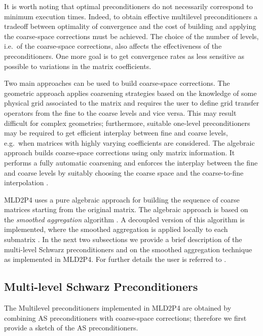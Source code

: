 It is worth noting that optimal preconditioners do not necessarily correspond
to minimum execution times. Indeed, to obtain effective multilevel preconditioners
a tradeoff between optimality of convergence and the cost of building and applying
the coarse-space corrections must be achieved. The choice of the number of levels,
i.e.\ of the coarse-space corrections, also affects the effectiveness of the
preconditioners. One more goal is to get convergence rates as less sensitive
as possible to variations in the matrix coefficients.

Two main approaches can be used to build coarse-space corrections. The geometric approach
applies coarsening strategies based on the knowledge of some physical grid associated
to the matrix and requires the user to define grid transfer operators from the fine
to the coarse levels and vice versa. This may result difficult for complex geometries;
furthermore, suitable one-level preconditioners may be required to get efficient
interplay between fine and coarse levels, e.g.\ when matrices with highly varying coefficients
are considered. The algebraic approach builds coarse-space corrections using only matrix
information. It performs a fully automatic coarsening and enforces the interplay between
the fine and coarse levels by suitably choosing the coarse space and the coarse-to-fine
interpolation \cite{StubenGMD69_99}.

MLD2P4 uses a pure algebraic approach for building the sequence of coarse matrices
starting from the original matrix. The algebraic approach is based on the \emph{smoothed 
aggregation} algorithm \cite{Brezina_Vanek_,Vanek_Mandel_Brezina_}. A decoupled version
of this algorithm is implemented, where the smoothed aggregation is applied locally
to each submatrix \cite{Tuminaro_Tong_00}. In the next two subsections we provide
a brief description of the multi-level Schwarz preconditioners and on the smoothed
aggregation technique as implemented in MLD2P4. For further details the user
is referred to \cite{para_04,apnum_07,aaecc_07,dd2_96}.


\subsection{Multi-level Schwarz Preconditioners\label{sec:multilevel}}

The Multilevel preconditioners implemented in MLD2P4 are obtained by combining
AS preconditioners with coarse-space corrections; therefore
we first provide a sketch of the AS preconditioners.

